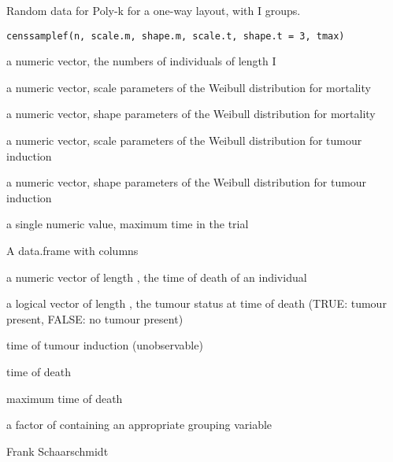 \begin{Description}\relax
Random data for Poly-k for a one-way layout, with I groups.
\end{Description}
\begin{Usage}
\begin{verbatim}
censsamplef(n, scale.m, shape.m, scale.t, shape.t = 3, tmax)
\end{verbatim}
\end{Usage}
\begin{Arguments}
\begin{ldescription}
\item[\code{n}] a numeric vector, the numbers of individuals of length I 
\item[\code{scale.m}] a numeric vector, scale parameters of the Weibull distribution for mortality 
\item[\code{shape.m}] a numeric vector, shape parameters of the Weibull distribution for mortality 
\item[\code{scale.t}] a numeric vector, scale parameters of the Weibull distribution for tumour induction 
\item[\code{shape.t}] a numeric vector, shape parameters of the Weibull distribution for tumour induction 
\item[\code{tmax}] a single numeric value, maximum time in the trial 
\end{ldescription}
\end{Arguments}
\begin{Details}\relax
\end{Details}
\begin{Value}
A data.frame with columns
\begin{ldescription}
\item[\code{time}] a numeric vector of length , the time of death of an individual
\item[\code{status}] a logical vector of length , the tumour status at time of death (TRUE: tumour present, FALSE: no tumour present)
\item[\code{T.t}] time of tumour induction (unobservable)
\item[\code{T.m}] time of death
\item[\code{tmax}] maximum time of death
\item[\code{f}] a factor of containing an appropriate grouping variable
\end{ldescription}
\end{Value}
\begin{Author}\relax
Frank Schaarschmidt
\end{Author}

